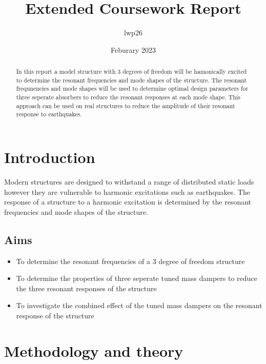 \documentclass[9pt]{article}
\begin{document}
\title{Extended Coursework Report}
\author{lwp26}
\date{Feburary 2023}
\maketitle

\begin{abstract}
    \centering
    In this report a model structure with 3 degrees of freedom will be hamonically excited to determine the resonant frequencies and mode shapes of the structure.
    The resonant frequnencies and mode shapes will be used to determine optimal design parameters for three seperate absorbers to reduce the resonant responses at each mode shape.
    This approach can be used on real structures to reduce the amplitude of their resonant response to earthquakes.
\end{abstract}

\section{Introduction}


Modern structures are designed to withstand a range of distributed static loads however they are vulnerable to harmonic excitations such as earthquakes.
The response of a structure to a harmonic excitation is determined by the resonant frequencies and mode shapes of the structure.

\subsection{Aims}

\begin{itemize}
\item To determine the resonant frequencies of a 3 degree of freedom structure
\item To determine the properties of three seperate tuned mass dampers to reduce the three resonant responses of the structure
\item To investigate the combined effect of the tuned mass dampers on the resonant response of the structure
\end{itemize}

\section{Methodology and theory}
\end{document}
